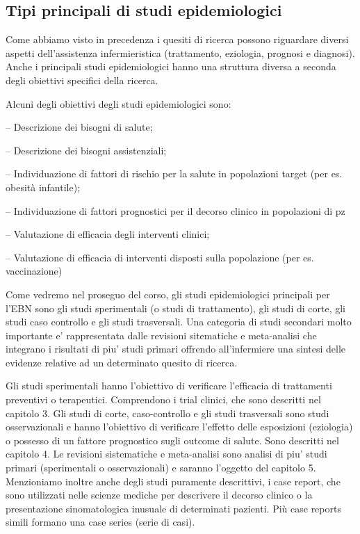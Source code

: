 \documentclass[]{book}
\begin{document}
\hypertarget{tipi-principali-di-studi-epidemiologici}{%
\subsection{Tipi principali di studi epidemiologici}\label{tipi-principali-di-studi-epidemiologici}}

Come abbiamo visto in precedenza i quesiti di ricerca possono riguardare diversi aspetti dell'assistenza infermieristica (trattamento, eziologia, prognosi e diagnosi). Anche i principali studi epidemiologici hanno una struttura diversa a seconda degli obiettivi specifici della ricerca.

Alcuni degli obiettivi degli studi epidemiologici sono:

-- Descrizione dei bisogni di salute;

-- Descrizione dei bisogni assistenziali;

-- Individuazione di fattori di rischio per la salute in popolazioni target (per es. obesità infantile);

-- Individuazione di fattori prognostici per il decorso clinico in popolazioni di pz

-- Valutazione di efficacia degli interventi clinici;

-- Valutazione di efficacia di interventi disposti sulla popolazione (per es. vaccinazione)

Come vedremo nel proseguo del corso, gli studi epidemiologici principali per l'EBN sono gli studi sperimentali (o studi di trattamento), gli studi di corte, gli studi caso controllo e gli studi trasversali. Una categoria di studi secondari molto importante e' rappresentata dalle revisioni sitematiche e meta-analisi che integrano i risultati di piu' studi primari offrendo all'infermiere una sintesi delle evidenze relative ad un determinato quesito di ricerca.

Gli studi sperimentali hanno l'obiettivo di verificare l'efficacia di trattamenti preventivi o terapeutici. Comprendono i trial clinici, che sono descritti nel capitolo 3. Gli studi di corte, caso-controllo e gli studi trasversali sono studi osservazionali e hanno l'obiettivo di verificare l'effetto delle esposizioni (eziologia) o possesso di un fattore prognostico sugli outcome di salute. Sono descritti nel capitolo 4. Le revisioni sistematiche e meta-analisi sono analisi di piu' studi primari (sperimentali o osservazionali) e saranno l'oggetto del capitolo 5. Menzioniamo inoltre anche degli studi puramente descrittivi, i case report, che sono utilizzati nelle scienze mediche per descrivere il decorso clinico o la presentazione sinomatologica inusuale di determinati pazienti. Più case reports simili formano una case series (serie di casi).
\end{document}
